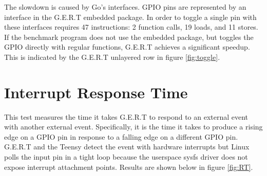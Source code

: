 The slowdown is caused by Go's
interfaces. GPIO pins are represented by an interface in the G.E.R.T embedded package.
In order to toggle a single pin with these interfaces requires 47 instructions:
2 function calls, 19 loads, and 11 stores. If the benchmark program does not use the
embedded package, but toggles the GPIO directly with regular functions,
G.E.R.T achieves a significant speedup. This is indicated by the G.E.R.T unlayered
row in figure \ref{fig:toggle}.


\section{Interrupt Response Time}\label{sec:int_time}
This test measures the time it takes G.E.R.T to respond to an external event
with another external event. Specifically, it is the time it takes to produce
a rising edge on a GPIO pin in response to a falling edge on a different GPIO pin.
G.E.R.T and the Teensy detect the event with hardware interrupts
but Linux polls the input pin in a tight loop because the userspace sysfs
driver does not expose interrupt attachment points.
Results are shown below in figure \ref{fig:RT}.




